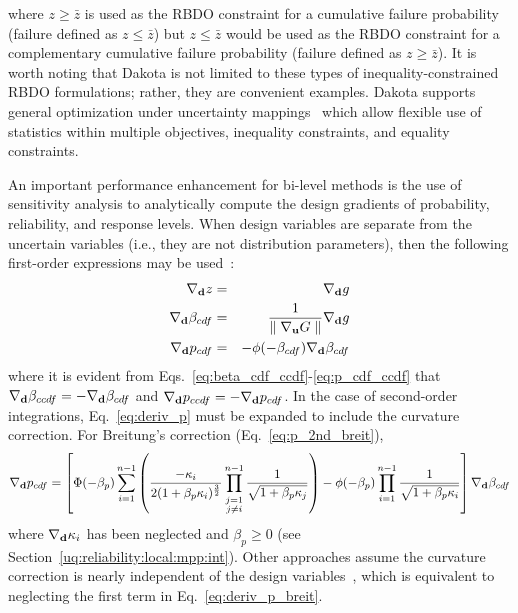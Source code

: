 \noindent where $z \ge \bar{z}$ is used as the RBDO constraint for 
a cumulative failure probability (failure defined as $z \le \bar{z}$)
but $z \le \bar{z}$ would be used as the RBDO constraint for a
complementary cumulative failure probability (failure defined as $z
\ge \bar{z}$).  It is worth noting that Dakota is not limited to these
types of inequality-constrained RBDO formulations; rather, they are
convenient examples.  Dakota supports general optimization under
uncertainty mappings~\cite{Eld02} which allow flexible use of
statistics within multiple objectives, inequality constraints, and
equality constraints.

An important performance enhancement for bi-level methods is the use
of sensitivity analysis to analytically compute the design gradients
of probability, reliability, and response levels.  When design
variables are separate from the uncertain variables (i.e., they are
not distribution parameters), then the following first-order 
expressions may be used~\cite{Hoh86,Kar92,All04}:
\begin{eqnarray}
\nabla_{\bf d} z           & = & \nabla_{\bf d} g \label{eq:deriv_z} \\
\nabla_{\bf d} \beta_{cdf} & = & \frac{1}{{\parallel \nabla_{\bf u} G 
\parallel}} \nabla_{\bf d} g \label{eq:deriv_beta} \\
\nabla_{\bf d} p_{cdf}     & = & -\phi(-\beta_{cdf}) \nabla_{\bf d} \beta_{cdf}
\label{eq:deriv_p}
\end{eqnarray}
where it is evident from Eqs.~\ref{eq:beta_cdf_ccdf}-\ref{eq:p_cdf_ccdf} 
that $\nabla_{\bf d} \beta_{ccdf} = -\nabla_{\bf d} \beta_{cdf}$ and 
$\nabla_{\bf d} p_{ccdf} = -\nabla_{\bf d} p_{cdf}$.  In the case of 
second-order integrations, Eq.~\ref{eq:deriv_p} must be expanded to 
include the curvature correction.  For Breitung's correction 
(Eq.~\ref{eq:p_2nd_breit}),
\begin{equation}
\nabla_{\bf d} p_{cdf} = \left[ \Phi(-\beta_p) \sum_{i=1}^{n-1} 
\left( \frac{-\kappa_i}{2 (1 + \beta_p \kappa_i)^{\frac{3}{2}}}
\prod_{\stackrel{\scriptstyle j=1}{j \ne i}}^{n-1} 
\frac{1}{\sqrt{1 + \beta_p \kappa_j}} \right) - 
\phi(-\beta_p) \prod_{i=1}^{n-1} \frac{1}{\sqrt{1 + \beta_p \kappa_i}} 
\right] \nabla_{\bf d} \beta_{cdf} \label{eq:deriv_p_breit}
\end{equation}
where $\nabla_{\bf d} \kappa_i$ has been neglected and $\beta_p \ge 0$
(see Section~\ref{uq:reliability:local:mpp:int}).  Other approaches assume
the curvature correction is nearly independent of the design
variables~\cite{Rac02}, which is equivalent to neglecting the first
term in Eq.~\ref{eq:deriv_p_breit}.


